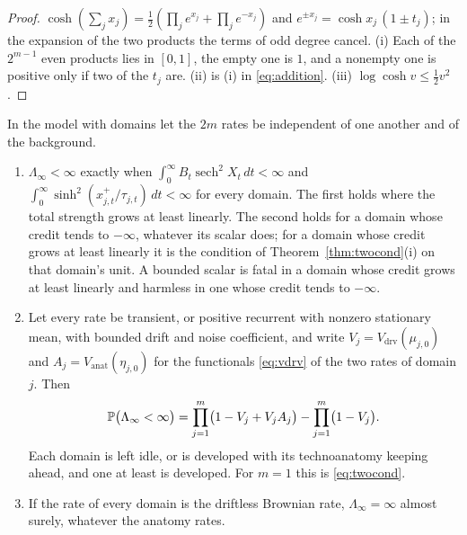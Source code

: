 \begin{proof}
$\cosh(\sum_jx_j)=\tfrac12(\prod_je^{x_j}+\prod_je^{-x_j})$ and
$e^{\pm x_j}=\cosh x_j\,(1\pm t_j)$; in the expansion of the two products
the terms of odd degree cancel. (i) Each of the $2^{m-1}$ even products
lies in $[0,1]$, the empty one is $1$, and a nonempty one is positive
only if two of the $t_j$ are. (ii) is (i) in \eqref{eq:addition}. (iii)
$\log\cosh v\le\tfrac12v^2$.
\end{proof}

\begin{theorem}\label{thm:domains}
In the model with domains let the $2m$ rates be independent of one
another and of the background.
\begin{enumerate}[label=\emph{(\roman*)},itemsep=1pt]
\item $\Lambda_\infty<\infty$ exactly when
$\int_0^\infty B_t\operatorname{sech}^2X_t\,dt<\infty$ and
$\int_0^\infty\sinh^2(x_{j,t}^+/\tau_{j,t})\,dt<\infty$ for every domain.
The first holds where the total strength grows at least linearly. The
second holds for a domain whose credit tends to $-\infty$, whatever its
scalar does; for a domain whose credit grows at least linearly it is the
condition of Theorem~\ref{thm:twocond}(i) on that domain's unit. A
bounded scalar is fatal in a domain whose credit grows at least linearly
and harmless in one whose credit tends to $-\infty$.
\item Let every rate be transient, or positive recurrent with nonzero
stationary mean, with bounded drift and noise coefficient, and write
$V_j=V_{\mathrm{drv}}(\mu_{j,0})$ and $A_j=V_{\mathrm{anat}}(\eta_{j,0})$
for the functionals \eqref{eq:vdrv} of the two rates of domain $j$. Then
\begin{equation}\label{eq:domainsprod}
\mathbb{P}\bigl(\Lambda_\infty<\infty\bigr)
=\prod_{j=1}^m\bigl(1-V_j+V_jA_j\bigr)-\prod_{j=1}^m\bigl(1-V_j\bigr).
\end{equation}
Each domain is left idle, or is developed with its technoanatomy keeping
ahead, and one at least is developed. For $m=1$ this is
\eqref{eq:twocond}.
\item If the rate of every domain is the driftless Brownian rate,
$\Lambda_\infty=\infty$ almost surely, whatever the anatomy rates.
\end{enumerate}
\end{theorem}

